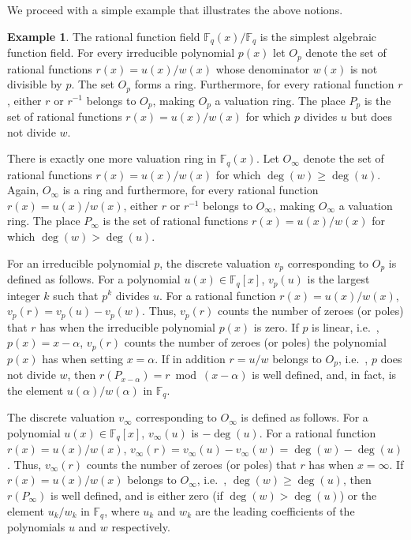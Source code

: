 \documentclass[10pt]{article}
\theoremstyle{definition}
\newtheorem{example}[theorem]{Example}
\providecommand{\ie}{i.e.\ }
\numberwithin{equation}{section}
\newcommand{\Fq}{{\mathbb{F}_q}}
\begin{document}
We proceed with a simple example that illustrates the above notions.
\begin{example}\label{exa:rational}
The rational function field $\Fq(x)/\Fq$ is the simplest algebraic function field.
For every irreducible polynomial
$p(x)$ let $O_p$ denote the set of rational functions
$r(x)={u(x)}/{w(x)}$ whose denominator $w(x)$ is not divisible
by $p$. The set $O_p$ forms a ring. Furthermore, for every rational function
$r$, either $r$ or $r^{-1}$ belongs to $O_p$, making $O_p$ a
valuation ring. The place $P_p$ is the set of rational functions
$r(x)={u(x)}/{w(x)}$ for which $p$ divides $u$ but does not
divide $w$.

There is exactly one more valuation ring in $\Fq(x)$.
Let $O_\infty$ denote the set of rational functions
$r(x)={u(x)}/{w(x)}$ for which $\deg(w) \ge \deg(u)$. Again,
$O_\infty$ is a ring and furthermore, for every rational function
$r(x)= {u(x)}/{w(x)}$, either $r$ or $r^{-1}$ belongs to
$O_\infty$, making $O_\infty$ a valuation ring. The place $P_\infty$
is the set of rational functions $r(x)= {u(x)}/{w(x)}$ for which
$\deg(w) > \deg(u)$.

For an irreducible polynomial $p$, the discrete valuation $v_p$ corresponding to $O_p$ is defined as follows.
For a polynomial $u(x) \in \Fq[x]$, $v_p(u)$ is the largest integer $k$ such that $p^k$ divides
$u$. For a rational function $r(x)= {u(x)}/{w(x)}$,
$v_p(r)=v_p(u)-v_p(w)$. Thus, $v_p(r)$ counts the number of zeroes
(or poles) that $r$ has when the irreducible polynomial $p(x)$ is
zero. If $p$ is linear, \ie, $p(x)=x-\alpha$, $v_p(r)$ counts the
number of zeroes (or poles) the polynomial $p(x)$ has when setting
$x=\alpha$. If in addition $r=u/w$ belongs to $O_p$, \ie, $p$ does
not divide $w$, then $r(P_{x-\alpha})=r \bmod (x-\alpha)$ is well
defined, and, in fact, is the element $u(\alpha)/w(\alpha)$ in
$\Fq$.

The discrete valuation $v_\infty$ corresponding to $O_\infty$ is defined as
follows. For a polynomial $u(x) \in \Fq[x]$, $v_\infty(u)$ is
$-\deg(u)$. For a rational function $r(x)= {u(x)}/{w(x)}$,
$v_\infty(r)=v_\infty(u)-v_\infty(w)=\deg(w)-\deg(u)$. Thus,
$v_\infty(r)$ counts the number of zeroes (or poles) that $r$ has
when $x=\infty$. If $r(x)=u(x)/w(x)$ belongs to $O_\infty$, \ie,
$\deg(w) \ge \deg(u)$, then $r(P_\infty)$ is well defined, and is
either zero (if $\deg(w) > \deg(u)$) or the element $u_k/w_k$ in
$\Fq$, where $u_k$ and $w_k$ are the leading coefficients of the
polynomials $u$ and $w$ respectively.
\end{example}
\end{document}

